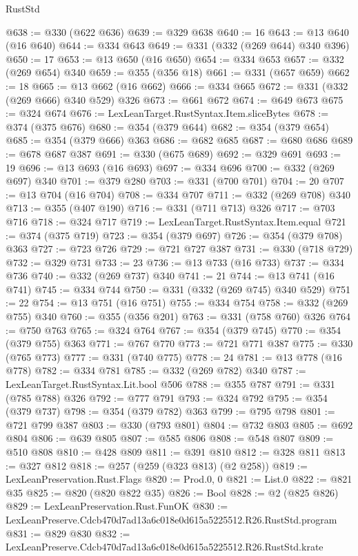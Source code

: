 \begin{lexlean}{RustStd}
\begin{coremodule}
@638 := @330 (@622 @636)
@639 := @329 @638
@640 := 16
@643 := @13 @640 (@16 @640)
@644 := @334 @643
@649 := @331 (@332 (@269 @644) @340 @396)
@650 := 17
@653 := @13 @650 (@16 @650)
@654 := @334 @653
@657 := @332 (@269 @654) @340
@659 := @355 (@356 @18)
@661 := @331 (@657 @659)
@662 := 18
@665 := @13 @662 (@16 @662)
@666 := @334 @665
@672 := @331 (@332 (@269 @666) @340 @529) @326
@673 := @661 @672
@674 := @649 @673
@675 := @324 @674
@676 := LexLeanTarget.RustSyntax.Item.sliceBytes
@678 := @374 (@375 @676)
@680 := @354 (@379 @644)
@682 := @354 (@379 @654)
@685 := @354 (@379 @666) @363
@686 := @682 @685
@687 := @680 @686
@689 := @678 @687 @387
@691 := @330 (@675 @689)
@692 := @329 @691
@693 := 19
@696 := @13 @693 (@16 @693)
@697 := @334 @696
@700 := @332 (@269 @697) @340
@701 := @379 @280
@703 := @331 (@700 @701)
@704 := 20
@707 := @13 @704 (@16 @704)
@708 := @334 @707
@711 := @332 (@269 @708) @340
@713 := @355 (@407 @190)
@716 := @331 (@711 @713) @326
@717 := @703 @716
@718 := @324 @717
@719 := LexLeanTarget.RustSyntax.Item.equal
@721 := @374 (@375 @719)
@723 := @354 (@379 @697)
@726 := @354 (@379 @708) @363
@727 := @723 @726
@729 := @721 @727 @387
@731 := @330 (@718 @729)
@732 := @329 @731
@733 := 23
@736 := @13 @733 (@16 @733)
@737 := @334 @736
@740 := @332 (@269 @737) @340
@741 := 21
@744 := @13 @741 (@16 @741)
@745 := @334 @744
@750 := @331 (@332 (@269 @745) @340 @529)
@751 := 22
@754 := @13 @751 (@16 @751)
@755 := @334 @754
@758 := @332 (@269 @755) @340
@760 := @355 (@356 @201)
@763 := @331 (@758 @760) @326
@764 := @750 @763
@765 := @324 @764
@767 := @354 (@379 @745)
@770 := @354 (@379 @755) @363
@771 := @767 @770
@773 := @721 @771 @387
@775 := @330 (@765 @773)
@777 := @331 (@740 @775)
@778 := 24
@781 := @13 @778 (@16 @778)
@782 := @334 @781
@785 := @332 (@269 @782) @340
@787 := LexLeanTarget.RustSyntax.Lit.bool @506
@788 := @355 @787
@791 := @331 (@785 @788) @326
@792 := @777 @791
@793 := @324 @792
@795 := @354 (@379 @737)
@798 := @354 (@379 @782) @363
@799 := @795 @798
@801 := @721 @799 @387
@803 := @330 (@793 @801)
@804 := @732 @803
@805 := @692 @804
@806 := @639 @805
@807 := @585 @806
@808 := @548 @807
@809 := @510 @808
@810 := @428 @809
@811 := @391 @810
@812 := @328 @811
@813 := @327 @812
@818 := @257 (@259 (@323 @813) (@2 @258))
@819 := LexLeanPreservation.Rust.Flags
@820 := Prod.{0, 0}
@821 := List.{0}
@822 := @821 @35
@825 := @820 (@820 @822 @35)
@826 := Bool
@828 := @2 (@825 @826)
@829 := LexLeanPreservation.Rust.FunOK
@830 := LexLeanPreserve.Cdcb470d7ad13a6c018e0d615a5225512.R26.RustStd.program
@831 := @829 @830
@832 := LexLeanPreserve.Cdcb470d7ad13a6c018e0d615a5225512.R26.RustStd.krate

\end{coremodule}
\end{lexlean}
